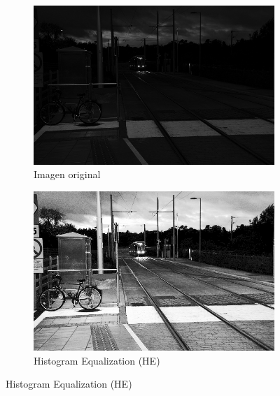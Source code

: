 \documentclass[sigchi]{acmart}
\begin{document}
\begin{figure}[htbp]
	\centering

	\begin{subfigure}[b]{0.32\textwidth}
		\centering
		\includegraphics[width=\linewidth]{./procesadas/2015_00026/2015_00026_original.png}
		\caption{Imagen original}
	\end{subfigure}
	\hfill
	\begin{subfigure}[b]{0.32\textwidth}
		\centering
		\includegraphics[width=\linewidth]{./procesadas/2015_00026/2015_00026_he.png}
		\caption{Histogram Equalization (HE)}
	\end{subfigure}


\end{figure}
\end{document}
